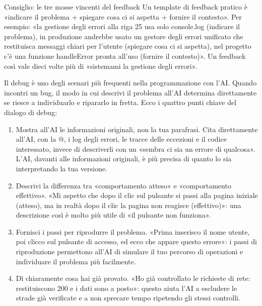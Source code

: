 \begin{tcbinfo}{Consiglio: le tre mosse vincenti del feedback}
Un template di feedback pratico è «indicare il problema + spiegare cosa ci si aspetta + fornire il contesto». Per esempio: «la gestione degli errori alla riga 25 usa solo console.log (indicare il problema), in produzione andrebbe usato un gestore degli errori unificato che restituisca messaggi chiari per l'utente (spiegare cosa ci si aspetta), nel progetto c'è una funzione handleError pronta all'uso (fornire il contesto)». Un feedback così vale dieci volte più di «sistemami la gestione degli errori».

\end{tcbinfo}


Il debug è uno degli scenari più frequenti nella programmazione con l'AI. Quando incontri un bug, il modo in cui descrivi il problema all'AI determina direttamente se riesce a individuarlo e ripararlo in fretta. Ecco i quattro punti chiave del dialogo di debug:

\begin{enumerate}
  \item Mostra all'AI le informazioni originali, non la tua parafrasi. Cita direttamente all'AI, con la @, i log degli errori, le tracce delle eccezioni e il codice interessato, invece di descriverli con un «sembra ci sia un errore di qualcosa». L'AI, davanti alle informazioni originali, è più precisa di quanto lo sia interpretando la tua versione.
  \item Descrivi la differenza tra «comportamento atteso» e «comportamento effettivo». «Mi aspetto che dopo il clic sul pulsante si passi alla pagina iniziale (atteso), ma in realtà dopo il clic la pagina non reagisce (effettivo)»: una descrizione così è molto più utile di «il pulsante non funziona».
  \item Fornisci i passi per riprodurre il problema. «Prima inserisco il nome utente, poi clicco sul pulsante di accesso, ed ecco che appare questo errore»: i passi di riproduzione permettono all'AI di simulare il tuo percorso di operazioni e individuare il problema più facilmente.
  \item Dì chiaramente cosa hai già provato. «Ho già controllato le richieste di rete: restituiscono 200 e i dati sono a posto»: questo aiuta l'AI a escludere le strade già verificate e a non sprecare tempo ripetendo gli stessi controlli.
\end{enumerate}

